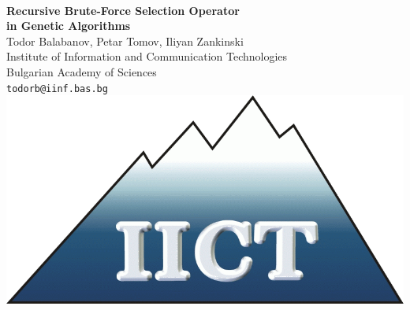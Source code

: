 \documentclass[a0,portrait,25pt]{sciposter}
\begin{document}
\pagecolor{LightGray}

\begin{mdframed}[backgroundcolor=white,roundcorner=4pt,shadow=true,linewidth=1pt]
\begin{minipage}[b]{1.44  \linewidth}
\begin{multicols}{2} \ \color{DimGray}

\Huge \textbf{Recursive Brute-Force Selection Operator \\ in Genetic Algorithms} \\ [0.4cm]
\huge {Todor Balabanov, Petar Tomov, Iliyan Zankinski} \\ [0.4cm]
\huge Institute of Information and Communication Technologies \\ Bulgarian Academy of Sciences \\ [0.4cm]
\Large \texttt{todorb@iinf.bas.bg} \\ [1.4cm]

\includegraphics[width=20cm]{logo-iict-en}
\end{multicols}
\end{minipage}
\end{mdframed}

\vspace{0.5cm}
\end{document}
